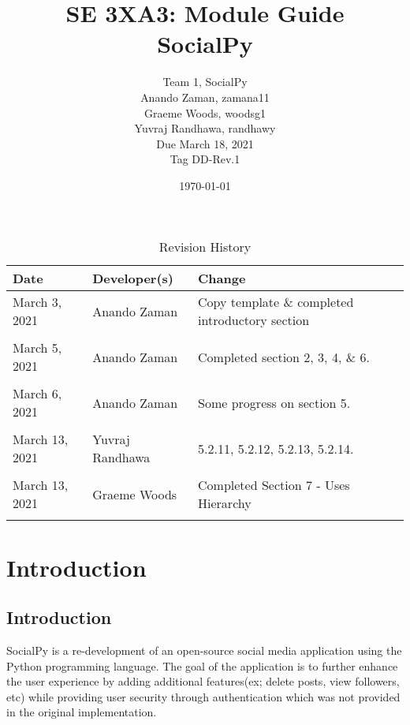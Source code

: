 \documentclass[12pt, titlepage]{article}
\title{SE 3XA3: Module Guide\\SocialPy}
\author{
	Team 1, SocialPy
		\\ Anando Zaman, zamana11
        \\ Graeme Woods, woodsg1
        \\ Yuvraj Randhawa, randhawy
        \\ Due March 18, 2021
        \\ Tag DD-Rev.1
}
\date{\today}
\begin{document}
\maketitle

\tableofcontents
\listoftables
\listoffigures

\newpage
\begin{table}[htbp]
    \caption{Revision History} \label{RevisionHistory}
    \begin{tabularx}{\textwidth}{llX}
        \toprule
            \textbf{Date} & \textbf{Developer(s)} & \textbf{Change}\\
        \midrule
            March 3, 2021 & Anando Zaman & Copy template \& completed introductory section\\\\
            March 5, 2021 & Anando Zaman & Completed section 2, 3, 4, \& 6.\\\\
            March 6, 2021 & Anando Zaman & Some progress on section 5.\\\\
            March 13, 2021 & Yuvraj Randhawa & 5.2.11, 5.2.12, 5.2.13, 5.2.14.\\\\
            March 13, 2021 & Graeme Woods & Completed Section 7 - Uses Hierarchy\\\\
        \bottomrule
    \end{tabularx}
\end{table}

\newpage

\section{Introduction}
\subsection{Introduction}
SocialPy is a re-development of an open-source social media application using the Python programming language. The goal of the application is to further enhance the user experience by adding additional features(ex; delete posts, view followers, etc) while providing user security through authentication which was not provided in the original implementation.
\end{document}
